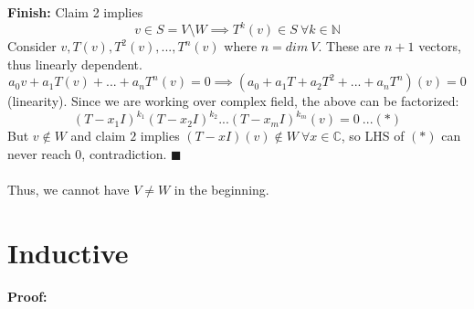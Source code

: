 \documentclass{article}
\begin{document}
\textbf{Finish:} Claim 2 implies $$v\in S=V\setminus W\implies T^k(v)\in S\ \forall k\in \mathbb{N}$$Consider $v,T(v),T^2(v),...,T^n(v)$ where $n=dim\ V$. These are $n+1$ vectors, thus linearly dependent. $$a_0v+a_1T(v)+...+a_nT^n(v)=0\implies (a_0+a_1T+a_2T^2+...+a_nT^n)(v)=0$$(linearity). Since we are working over complex field, the above can be factorized: $$(T-x_1I)^{k_1} (T-x_2I)^{k_2}...(T-x_mI)^{k_m}(v)=0\ ...(*)$$But $v\notin W$ and claim $2$ implies $(T-xI)(v)\notin W\ \forall x\in \mathbb{C}$, so LHS of $(*)$ can never reach $0$, contradiction. $\blacksquare$ \\ \\
Thus, we cannot have $V\neq W$ in the beginning.






\section{Inductive}
\textbf{Proof:}
\end{document}
